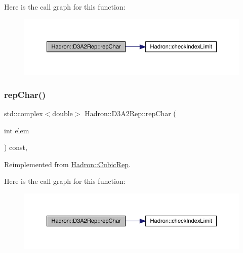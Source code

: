 Here is the call graph for this function\+:
\nopagebreak
\begin{figure}[H]
\begin{center}
\leavevmode
\includegraphics[width=350pt]{d5/d7f/structHadron_1_1D3A2Rep_a89c199bea81c3c1da8687a5cbd7498c0_cgraph}
\end{center}
\end{figure}
\mbox{\label{structHadron_1_1D3A2Rep_a89c199bea81c3c1da8687a5cbd7498c0}} 
\subsubsection{\texorpdfstring{repChar()}{repChar()}\hspace{0.1cm}{\footnotesize\ttfamily [2/2]}}
{\footnotesize\ttfamily std\+::complex$<$double$>$ Hadron\+::\+D3\+A2\+Rep\+::rep\+Char (\begin{DoxyParamCaption}\item[{int}]{elem }\end{DoxyParamCaption}) const\hspace{0.3cm}{\ttfamily [inline]}, {\ttfamily [virtual]}}



Reimplemented from \mbox{\hyperlink{structHadron_1_1CubicRep_af45227106e8e715e84b0af69cd3b36f8}{Hadron\+::\+Cubic\+Rep}}.

Here is the call graph for this function\+:
\nopagebreak
\begin{figure}[H]
\begin{center}
\leavevmode
\includegraphics[width=350pt]{d5/d7f/structHadron_1_1D3A2Rep_a89c199bea81c3c1da8687a5cbd7498c0_cgraph}
\end{center}
\end{figure}
\mbox{\label{structHadron_1_1D3A2Rep_a0e868a4c14c9126108a49d429add3c94}} 
